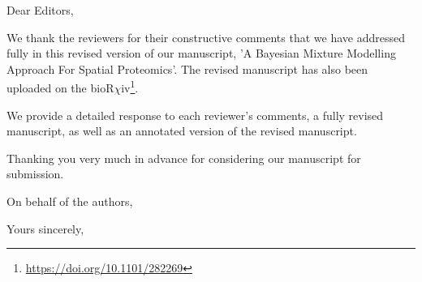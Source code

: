 \documentclass[10pt,a4paper]{letter}
\begin{document}
\begin{letter}{
}

\opening{Dear Editors,}

\thispagestyle{fancy}

We thank the reviewers for their constructive comments that we have
addressed fully in this revised version of our manuscript, 'A Bayesian
Mixture Modelling Approach For Spatial Proteomics'. The revised
manuscript has also been uploaded on the
bioR$\chi$iv\footnote{\url{https://doi.org/10.1101/282269}}.

We provide a detailed response to each reviewer's comments, a fully
revised manuscript, as well as an annotated version of the revised
manuscript.

Thanking you very much in advance for considering our manuscript for
submission.

On behalf of the authors,

\closing{Yours sincerely, \\
}


\end{letter}
\end{document}
